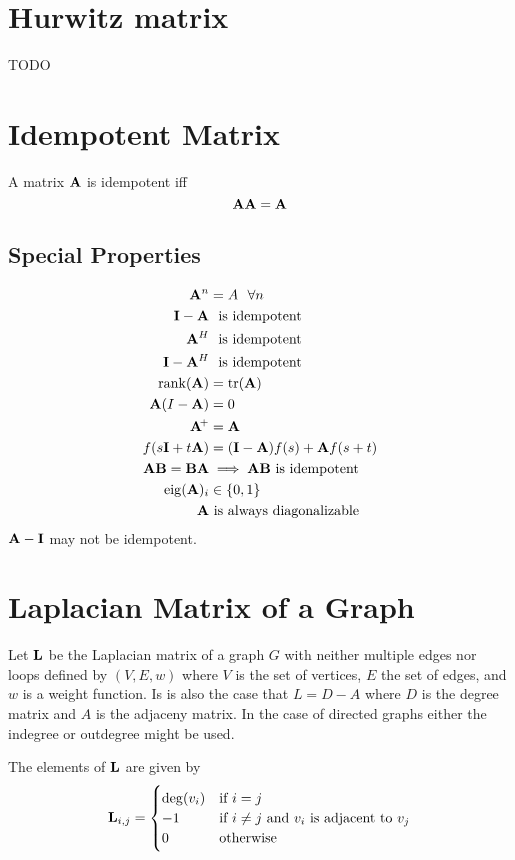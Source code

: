 \section{Hurwitz matrix}
TODO


\section{Idempotent Matrix}
A matrix $\mathbf{A}$ is idempotent iff
\begin{equation}
\mathbf{A}\mathbf{A}=\mathbf{A}
\end{equation}

\subsection*{Special Properties}
\begin{align}
\mathbf{A}^n        &=A~~\forall n              \\
\mathbf{I}-\mathbf{A}      &~~\textrm{is idempotent}   \\
\mathbf{A}^H        &~~\textrm{is idempotent}   \\
\mathbf{I}-\mathbf{A}^H    &~~\textrm{is idempotent}   \\
\operatorname{rank}(\mathbf{A})   &= \operatorname{tr}(\mathbf{A})              \\
\mathbf{A}(I-\mathbf{A})   &= 0                        \\
\mathbf{A}\!^+     &= \mathbf{A}                      \\
f(s\mathbf{I}+t\mathbf{A}) &= (\mathbf{I}-\mathbf{A})f(s)+\mathbf{A} f(s+t) \\
\mathbf{A}\mathbf{B}=\mathbf{B}\mathbf{A}&\implies \mathbf{A}\mathbf{B}~\textrm{is idempotent} \\
\operatorname{eig}(\mathbf{A})_i  &\in \{0,1\} \\
\mathbf{A} & \textrm{~is always diagonalizable}
\end{align}
$\mathbf{A}-\mathbf{I}$ may not be idempotent.



\section{Laplacian Matrix of a Graph}
Let $\mathbf{L}$ be the Laplacian matrix of a graph $G$ with neither multiple edges nor loops defined by $(V,E,w)$ where $V$ is the set of vertices, $E$ the set of edges, and $w$ is a weight function. Is is also the case that $L=D-A$ where $D$ is the degree matrix and $A$ is the adjaceny matrix. In the case of directed graphs either the indegree or outdegree might be used.

The elements of $\mathbf{L}$ are given by
\begin{equation}
\mathbf{L}_{i,j} = \begin{cases}
  \deg(v_i) & \textrm{if $i=j$} \\
  -1        & \textrm{if $i\ne j$ and $v_i$ is adjacent to $v_j$} \\
   0        & \textrm{otherwise}
\end{cases}
\end{equation}

